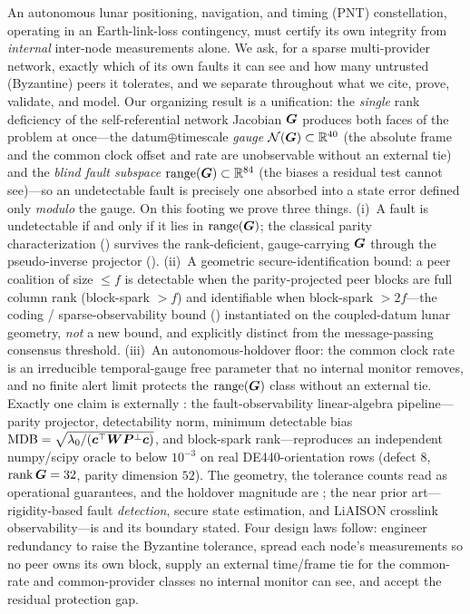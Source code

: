An autonomous lunar positioning, navigation, and timing (PNT) constellation, operating in
an Earth-link-loss contingency, must certify its own integrity from \emph{internal}
inter-node measurements alone. We ask, for a sparse multi-provider network, exactly which
of its own faults it can see and how many untrusted (Byzantine) peers it tolerates, and we
separate throughout what we cite, prove, validate, and model. Our organizing result is a
unification: the \emph{single} rank deficiency of the self-referential network Jacobian
$\bm{G}$ produces both faces of the problem at once---the datum$\oplus$timescale
\emph{gauge} $\mathcal{N}(\bm{G})\subset\mathbb{R}^{40}$ (the absolute frame and the common clock offset
and rate are unobservable without an external tie) and the \emph{blind fault subspace}
$\operatorname{range}(\bm{G})\subset\mathbb{R}^{84}$ (the biases a residual test cannot see)---so an undetectable
fault is precisely one absorbed into a state error defined only \emph{modulo} the gauge. On
this footing we prove three things. (i)~A fault is undetectable if and only if it lies in
$\operatorname{range}(\bm{G})$; the classical parity characterization (\Cited{}) survives the rank-deficient,
gauge-carrying $\bm{G}$ through the pseudo-inverse projector (\Proven{}). (ii)~A geometric
secure-identification bound: a peer coalition of size $\le f$ is detectable when the
parity-projected peer blocks are full column rank (block-spark $>f$) and identifiable when
block-spark $>2f$---the coding / sparse-observability bound (\Cited{}) instantiated on the
coupled-datum lunar geometry, \emph{not} a new bound, and explicitly distinct from the
message-passing consensus threshold. (iii)~An autonomous-holdover floor: the common clock
rate is an irreducible temporal-gauge free parameter that no internal monitor removes, and
no finite alert limit protects the $\operatorname{range}(\bm{G})$ class without an external tie. Exactly one
claim is externally \Validated{}: the fault-observability linear-algebra pipeline---parity
projector, detectability norm, minimum detectable bias $\operatorname{MDB}=\sqrt{\lambda_0/(\bm c^\top\bm{W}\bm{P}^{\perp}\bm c)}$,
and block-spark rank---reproduces an independent numpy/scipy oracle to below $10^{-3}$ on
real DE440-orientation rows (defect $8$, $\operatorname{rank}\bm{G}=32$, parity dimension $52$). The
geometry, the tolerance counts read as operational guarantees, and the holdover magnitude
are \Modelled{}; the near prior art---rigidity-based fault \emph{detection}, secure state
estimation, and LiAISON crosslink observability---is \Cited{} and its boundary stated. Four
design laws follow: engineer redundancy to raise the Byzantine tolerance, spread each node's
measurements so no peer owns its own block, supply an external time/frame tie for the
common-rate and common-provider classes no internal monitor can see, and accept the residual
protection gap.
